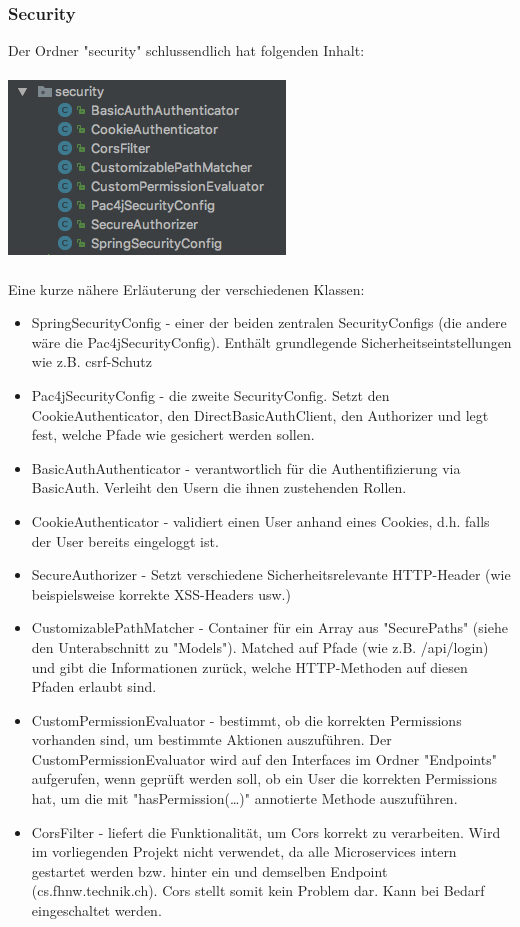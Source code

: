 \documentclass[11pt]{article} %
\begin{document}
\subsubsection{Security}
Der Ordner "security" schlussendlich hat folgenden Inhalt:
\\
\\
\includegraphics[scale=0.7]{structure_eventmanagement_security}
\\
\\
Eine kurze nähere Erläuterung der verschiedenen Klassen:
\begin{itemize}
\item SpringSecurityConfig - einer der beiden zentralen SecurityConfigs (die andere wäre die Pac4jSecurityConfig). Enthält grundlegende Sicherheitseintstellungen wie z.B. csrf-Schutz
\item Pac4jSecurityConfig - die zweite SecurityConfig. Setzt den CookieAuthenticator, den DirectBasicAuthClient, den Authorizer und legt fest, welche Pfade wie gesichert werden sollen.
\item BasicAuthAuthenticator - verantwortlich für die Authentifizierung via BasicAuth. Verleiht den Usern die ihnen zustehenden Rollen.
\item CookieAuthenticator - validiert einen User anhand eines Cookies, d.h. falls der User bereits eingeloggt ist.
\item SecureAuthorizer - Setzt verschiedene Sicherheitsrelevante HTTP-Header (wie beispielsweise korrekte XSS-Headers usw.)
\item CustomizablePathMatcher - Container für ein Array aus "SecurePaths" (siehe den Unterabschnitt zu "Models"). Matched auf Pfade (wie z.B. /api/login) und gibt die Informationen zurück, welche HTTP-Methoden auf diesen Pfaden erlaubt sind.
\item CustomPermissionEvaluator - bestimmt, ob die korrekten Permissions vorhanden sind, um bestimmte Aktionen auszuführen. Der CustomPermissionEvaluator wird auf den Interfaces im Ordner "Endpoints" aufgerufen, wenn geprüft werden soll, ob ein User die korrekten Permissions hat, um die mit "hasPermission(…)" annotierte Methode auszuführen.
\item CorsFilter - liefert die Funktionalität, um Cors korrekt zu verarbeiten. Wird im vorliegenden Projekt nicht verwendet, da alle Microservices intern gestartet werden bzw. hinter ein und demselben Endpoint (cs.fhnw.technik.ch). Cors stellt somit kein Problem dar. Kann bei Bedarf eingeschaltet werden.
\end{itemize}
\end{document}

